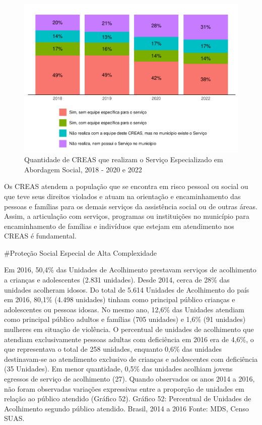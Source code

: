 \documentclass[
  brazilian]{report}
\begin{document}
\begin{figure}
\includegraphics{Censo-SUAS-2022_files/figure-latex/CREAS-abordagem-social-1} \caption[Quantidade de CREAS que realizam o Serviço Especializado em Abordagem Social, 2018 - 2020 e 2022]{Quantidade de CREAS que realizam o Serviço Especializado em Abordagem Social, 2018 - 2020 e 2022}\label{fig:CREAS-abordagem-social}
\end{figure}

Os CREAS atendem a população que se encontra em risco pessoal ou social
ou que teve seus direitos violados e atuam na orientação e
encaminhamento das pessoas e famílias para os demais serviços da
assistência social ou de outras áreas. Assim, a articulação com
serviços, programas ou instituições no município para encaminhamento de
famílias e indivíduos que estejam em atendimento nos CREAS é
fundamental.

\#Proteção Social Especial de Alta Complexidade

Em 2016, 50,4\% das Unidades de Acolhimento prestavam serviços de
acolhimento a crianças e adolescentes (2.831 unidades). Desde 2014,
cerca de 28\% das unidades acolheram idosos. Do total de 5.614 Unidades
de Acolhimento do país em 2016, 80,1\% (4.498 unidades) tinham como
principal público crianças e adolescentes ou pessoas idosas. No mesmo
ano, 12,6\% das Unidades atendiam como principal público adultos e
famílias (705 unidades) e 1,6\% (91 unidades) mulheres em situação de
violência. O percentual de unidades de acolhimento que atendiam
exclusivamente pessoas adultas com deficiência em 2016 era de 4,6\%, o
que representava o total de 258 unidades, enquanto 0,6\% das unidades
destinavam-se ao atendimento exclusivo de crianças e adolescentes com
deficiência (35 Unidades). Em menor quantidade, 0,5\% das unidades
acolhiam jovens egressos de serviço de acolhimento (27). Quando
observados os anos 2014 a 2016, não foram observadas variações
expressivas entre a proporção de unidades em relação ao público atendido
(Gráfico 52). Gráfico 52: Percentual de Unidades de Acolhimento segundo
público atendido. Brasil, 2014 a 2016 Fonte: MDS, Censo SUAS.
\end{document}
